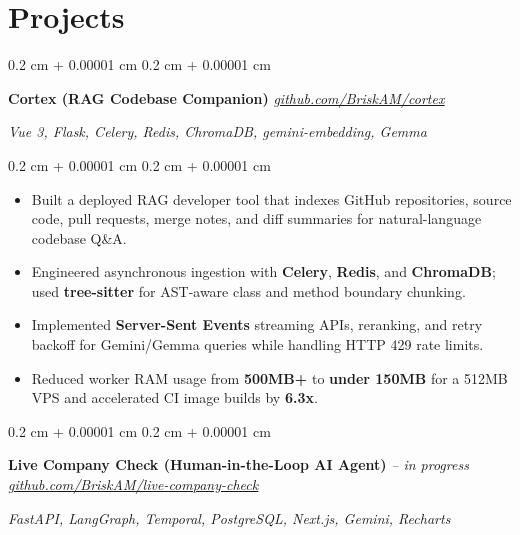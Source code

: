 \documentclass[10pt, letterpaper]{article}
\newenvironment{highlights}{
    \small
    \begin{itemize}[
        topsep=0.02 cm,
        parsep=0.015 cm,
        partopsep=0pt,
        itemsep=0.015 cm,
        leftmargin=0.4 cm + 10pt
    ]
}{
    \end{itemize}
} %
\newenvironment{onecolentry}{
    \begin{adjustwidth}{
        0.2 cm + 0.00001 cm
    }{
        0.2 cm + 0.00001 cm
    }
}{
    \end{adjustwidth}
} %
\let\hrefWithoutArrow\href
\renewcommand{\href}[2]{\hrefWithoutArrow{#1}{\uline{#2}}}
\newcommand{\printlink}[2]{\href{#1}{#2}}
\begin{document}
    \section{Projects}

        \begin{onecolentry}
            \textbf{Cortex (RAG Codebase Companion)} \hfill \textit{\footnotesize \printlink{https://github.com/BriskAM/cortex}{github.com/BriskAM/cortex}}

            \textit{Vue 3, Flask, Celery, Redis, ChromaDB, gemini-embedding, Gemma}
        \end{onecolentry}

        \vspace{0.02 cm}

        \begin{onecolentry}
            \begin{highlights}
                \item Built a deployed RAG developer tool that indexes GitHub repositories, source code, pull requests, merge notes, and diff summaries for natural-language codebase Q\&A.
                \item Engineered asynchronous ingestion with \textbf{Celery}, \textbf{Redis}, and \textbf{ChromaDB}; used \textbf{tree-sitter} for AST-aware class and method boundary chunking.
                \item Implemented \textbf{Server-Sent Events} streaming APIs, reranking, and retry backoff for Gemini/Gemma queries while handling HTTP 429 rate limits.
                \item Reduced worker RAM usage from \textbf{500MB+} to \textbf{under 150MB} for a 512MB VPS and accelerated CI image builds by \textbf{6.3x}.
            \end{highlights}
        \end{onecolentry}

        \vspace{0.04 cm}

        \begin{onecolentry}
            \textbf{Live Company Check (Human-in-the-Loop AI Agent)} \textit{-- in progress} \hfill \textit{\footnotesize \printlink{https://github.com/BriskAM/live-company-check}{github.com/BriskAM/live-company-check}}

            \textit{FastAPI, LangGraph, Temporal, PostgreSQL, Next.js, Gemini, Recharts}
        \end{onecolentry}
\end{document}
